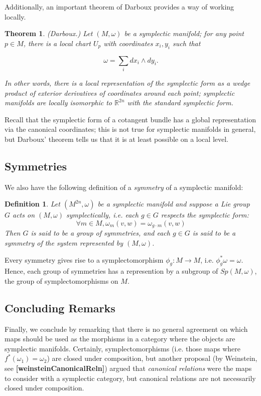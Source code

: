\documentclass{tufte-handout}
\newtheorem{thrm}{Theorem}
\newtheorem{defn}{Definition}
\begin{document}
Additionally, an important theorem of Darboux provides a way of working locally.
\begin{thrm}
(Darboux.) Let $(M,\omega)$ be a symplectic manifold; for any point $p \in M$, there is a local chart $U_p$ with coordinates $x_i,y_i$ such that 

$$\omega = \sum_i dx_i \wedge dy_i.$$

In other words, there is a local representation of the symplectic form as a wedge product of exterior derivatives of coordinates around each point; symplectic manifolds are locally isomorphic to $\mathbb{R}^{2n}$ with the standard symplectic form.
\end{thrm}
Recall that the symplectic form of a cotangent bundle has a global representation via the canonical coordinates; this is not true for symplectic manifolds in general, but Darboux' theorem tells us that it is at least possible on a local level.

\subsection{Symmetries}
We also have the following definition of a \emph{symmetry} of a symplectic manifold:
\begin{defn}
Let $(M^{2n},\omega)$ be a symplectic manifold and suppose a Lie group $G$ acts on $(M,\omega)$ symplectically, i.e. each $g \in G$ respects the symplectic form:
$$
\forall m \in M, \omega_m(v,w) = \omega_{g\cdot m}(v,w)
$$
Then $G$ is said to be a \emph{group of symmetries}, and each $g \in G$ is said to be a symmetry of the system represented by $(M,\omega)$.
\end{defn}

Every symmetry gives rise to a symplectomorphism $\phi_g : M \to M$, i.e. $\phi^*_g \omega = \omega$. Hence, each group of symmetries has a represention by a subgroup of $Sp(M,\omega)$, the group of symplectomorphisms on $M$.

\subsection{Concluding Remarks}
Finally, we conclude by remarking that there is no general agreement on which maps should be used as the morphisms in a category where the objects are symplectic manifolds. Certainly, symplectomorphisms (i.e. those maps where $f^*(\omega_1) = \omega_2$) are closed under composition, but another proposal (by Weinstein, see \textbf{[weinsteinCanonicalReln]}) argued that \emph{canonical relations} were the maps to consider with a symplectic category, but canonical relations are not necessarily closed under composition.
\end{document}
